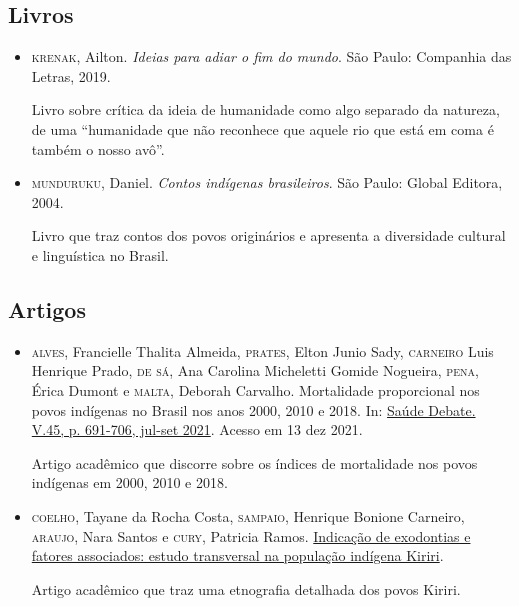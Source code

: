 \documentclass[11pt]{extarticle}
\begin{document}
\subsection{Livros} 

\begin{itemize}
\item \textsc{krenak}, Ailton. \textit{Ideias para adiar o fim do mundo}. São Paulo: Companhia das Letras, 2019.

Livro sobre crítica da ideia de humanidade como algo separado da natureza, de uma ``humanidade que não reconhece que aquele rio que está em coma é também o nosso avô''.

\item \textsc{munduruku}, Daniel. \textit{Contos indígenas brasileiros}. São Paulo: Global Editora, 2004.

Livro que traz contos dos povos originários e apresenta a diversidade cultural e linguística no Brasil.
\end{itemize}

\subsection{Artigos}

\begin{itemize}
\item \textsc{alves}, Francielle Thalita Almeida, \textsc{prates}, Elton Junio Sady, \textsc{carneiro} Luis Henrique Prado, \textsc{de sá}, Ana Carolina Micheletti Gomide Nogueira, \textsc{pena}, Érica Dumont e \textsc{malta}, Deborah Carvalho. Mortalidade proporcional nos povos indígenas no Brasil nos anos 2000, 2010 e 2018. 
In: \href{https://www.scielo.br/j/sdeb/a/DjX5mjjj5GjMVrHnMsnvKVx/?format=pdf&lang=pt}{Saúde Debate. V.45, p. 691-706, jul-set 2021}. 
Acesso em 13 dez 2021. 

Artigo acadêmico que discorre sobre os índices de mortalidade nos povos indígenas em 2000, 2010 e 2018. 

\item \textsc{coelho}, Tayane da Rocha Costa, \textsc{sampaio}, Henrique Bonione Carneiro, \textsc{araujo}, Nara Santos e \textsc{cury}, Patricia Ramos. \href{https://www.scielo.br/j/csc/a/5dWp6FdB4zs6Y8cZtjDXQqD/?lang=pt}{Indicação de exodontias e fatores associados: estudo transversal na população indígena Kiriri}.  

Artigo acadêmico que traz uma etnografia detalhada dos povos Kiriri.  
\end{itemize}
\end{document}
